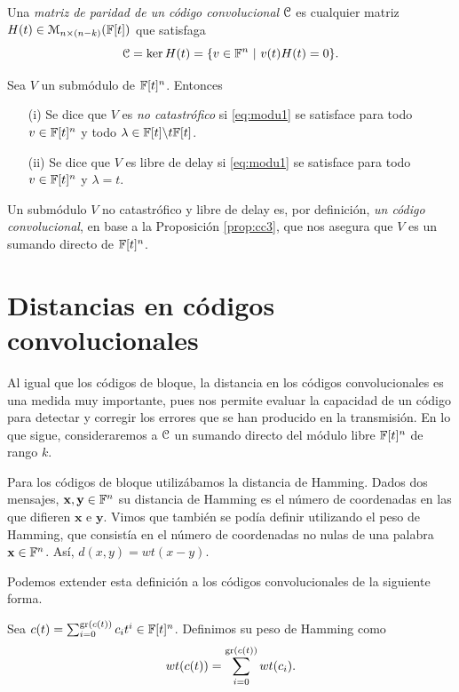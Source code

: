 \begin{definicion}
Una \emph{matriz de paridad de un código convolucional} $\mathcal C$ es cualquier matriz $H(t) \in \mathcal{M}_{n \times (n-k)}(\mathbb{F}[t])$ que satisfaga $$\mathcal C = \ker H(t) =  \{v \in \mathbb{F}^n \ | \ v(t)H(t) = 0\}.$$
\end{definicion}

\begin{definicion}
Sea $V$ un submódulo de $\mathbb{F}[t]^n$. Entonces 
\begin{itemize}
    \item[(i)] Se dice que $V$ es \emph{no catastrófico} si \eqref{eq:modu1} se satisface para todo $v \in \mathbb{F}[t]^n$ y todo $\lambda \in \mathbb{F}[t]\backslash t\mathbb{F}[t]$.
    \item[(ii)] Se dice que $V$ es libre de delay si \eqref{eq:modu1} se satisface para todo $v \in \mathbb{F}[t]^n$ y $\lambda = t$. 
\end{itemize}
\end{definicion}

Un submódulo $V$ no catastrófico y libre de delay es, por definición, \emph{un código convolucional}, en base a la Proposición \ref{prop:cc3}, que nos asegura que $V$ es un sumando directo de $\mathbb{F}[t]^n$.

\section{Distancias en códigos convolucionales}\label{sec:distancias}

Al igual que los códigos de bloque, la distancia en los códigos convolucionales es una medida muy importante, pues nos permite evaluar la capacidad de un código para detectar y corregir los errores que se han producido en la transmisión. En lo que sigue, consideraremos a $\mathcal C$ un sumando directo del módulo libre $\mathbb{F}[t]^n$ de rango $k$.

Para los códigos de bloque utilizábamos la distancia de Hamming. Dados dos mensajes, $\mathbf{x,y} \in \mathbb{F}^n$ su distancia de Hamming es el número de coordenadas en las que difieren $\mathbf{x}$ e $\mathbf{y}$. Vimos que también se podía definir utilizando el peso de Hamming, que consistía en el número de coordenadas no nulas de una palabra $\mathbf{x} \in \mathbb{F}^n$. Así, $d(x,y) = wt(x - y)$.

Podemos extender esta definición a los códigos convolucionales de la siguiente forma.

\begin{definicion}
Sea $c(t) = \sum_{i=0}^{\operatorname{gr}(c(t))} c_it^i\in \mathbb{F}[t]^n$. Definimos su peso de Hamming como $$wt(c(t)) = \sum_{i=0}^{\operatorname{gr}(c(t))}wt(c_i).$$
\end{definicion}

